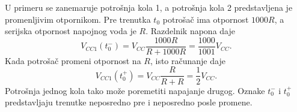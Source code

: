 U primeru se zanemaruje potrošnja kola 1, a potrošnja kola 2 predstavljena je promenljivim otpornikom. Pre trenutka $t_0$ potrošač ima otpornost $1000R$, a serijska otpornost napojnog voda je $R$. Razdelnik napona daje
\[V_{CC1}(t_0^-)=V_{CC}\frac{1000R}{R+1000R}=\frac{1000}{1001}V_{CC}.\]
Kada potrošač promeni otpornost na $R$, isto računanje daje
\[V_{CC1}(t_0^+)=V_{CC}\frac{R}{R+R}=\frac12V_{CC}.\]
Potrošnja jednog kola tako može poremetiti napajanje drugog. Oznake $t_0^-$ i $t_0^+$ predstavljaju trenutke neposredno pre i neposredno posle promene.

